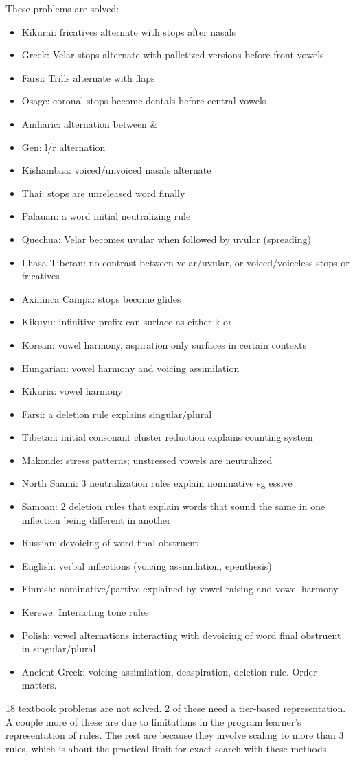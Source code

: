 \documentclass{article}
\begin{document}
\pagebreak
These problems are solved:
\begin{itemize}
\item Kikurai: fricatives alternate with stops after nasals
\item Greek: Velar stops alternate with palletized versions before front vowels
\item Farsi: Trills alternate with flaps
\item Osage: coronal stops become dentals before central vowels
\item Amharic: alternation between  \& 
\item Gen: l/r alternation
\item Kishambaa: voiced/unvoiced nasals alternate
\item  Thai: stops are unreleased word finally
\item Palauan: a word initial neutralizing rule
\item Quechua: Velar becomes uvular when followed by uvular (spreading)
\item Lhasa Tibetan: no contrast between velar/uvular, or voiced/voiceless stops or fricatives
\item Axininca Campa: stops become glides
\item Kikuyu: infinitive prefix can surface as either k or 
\item Korean: vowel harmony, aspiration only surfaces in certain contexts
\item Hungarian: vowel harmony and voicing assimilation
\item Kikuria: vowel harmony
\item Farsi: a deletion rule explains singular/plural
\item Tibetan: initial consonant cluster reduction explains counting system
\item Makonde: stress patterns; unstressed vowels are neutralized
\item North Saami: 3 neutralization rules explain nominative sg essive
\item Samoan: 2 deletion rules that explain words that sound the same in one inflection being different in another
\item     Russian: devoicing of word final obstruent
\item English: verbal inflections (voicing assimilation, epenthesis)
\item Finnish: nominative/partive explained by vowel raising and vowel harmony
\item Kerewe: Interacting tone rules
\item Polish: vowel alternations interacting with devoicing of word final obstruent in singular/plural
\item Ancient Greek: voicing assimilation, deaspiration, deletion rule. Order matters.
\end{itemize}
18 textbook problems are not solved. 2 of these need a tier-based representation. A couple more of these are due to limitations in the program learner's representation of rules. The rest are because they involve scaling to more than 3 rules, which is about the practical limit for exact search with these methods.
\pagebreak
\end{document}
